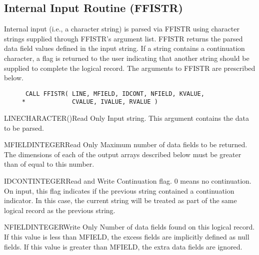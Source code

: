 \subsection{Internal Input Routine (FFISTR)}\label{sec:ffistr}

Internal input (i.e., a character string) is parsed via FFISTR using
character strings supplied through FFISTR's argument list.  FFISTR returns
the parsed data field values defined in the input string. If a string
contains a continuation character, a flag is returned to the user indicating
that another string should be supplied to complete the logical record. 
The arguments to FFISTR are prescribed below.
\begin{verbatim}
      CALL FFISTR( LINE, MFIELD, IDCONT, NFIELD, KVALUE,
     *             CVALUE, IVALUE, RVALUE )
\end{verbatim}

\begin{argy}{LINE}{CHARACTER\last(\last)}{Read Only}
Input string. This argument contains the data to be parsed.
\end{argy}

\begin{argy}{MFIELD}{INTEGER}{Read Only}
Maximum number of data fields to be returned.
The dimensions of each of the output
arrays described below must be greater than of equal to this number.
\end{argy}

\begin{argy}{IDCONT}{INTEGER}{Read and Write}
Continuation flag. 0 means no continuation. On input, this flag indicates
if the previous string contained a continuation indicator. In this case, the
current string will be treated as part of the same logical record as the
previous string.
\end{argy}

\begin{argy}{NFIELD}{INTEGER}{Write Only}
Number of data fields found on this logical record.  If this value is less
than MFIELD, the excess fields are implicitly defined as null fields.  If
this value is greater than MFIELD, the extra data fields are ignored.
\end{argy}

